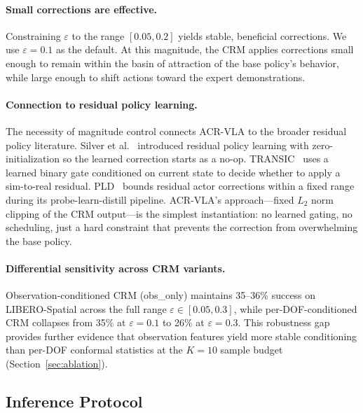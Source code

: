 \paragraph{Small corrections are effective.}
Constraining $\varepsilon$ to the range $[0.05, 0.2]$ yields stable, beneficial corrections. We use $\varepsilon = 0.1$ as the default. At this magnitude, the CRM applies corrections small enough to remain within the basin of attraction of the base policy's behavior, while large enough to shift actions toward the expert demonstrations.

\paragraph{Connection to residual policy learning.}
The necessity of magnitude control connects ACR-VLA to the broader residual policy literature. Silver et al.~\cite{silver2018residual} introduced residual policy learning with zero-initialization so the learned correction starts as a no-op. TRANSIC~\cite{jiang2024transic} uses a learned binary gate conditioned on current state to decide whether to apply a sim-to-real residual. PLD~\cite{xiao2026pld} bounds residual actor corrections within a fixed range during its probe-learn-distill pipeline. ACR-VLA's approach---fixed $L_2$ norm clipping of the CRM output---is the simplest instantiation: no learned gating, no scheduling, just a hard constraint that prevents the correction from overwhelming the base policy.

\paragraph{Differential sensitivity across CRM variants.}
Observation-conditioned CRM (obs\_only) maintains 35--36\% success on LIBERO-Spatial across the full range $\varepsilon \in [0.05, 0.3]$, while per-DOF-conditioned CRM collapses from 35\% at $\varepsilon = 0.1$ to 26\% at $\varepsilon = 0.3$. This robustness gap provides further evidence that observation features yield more stable conditioning than per-DOF conformal statistics at the $K{=}10$ sample budget (Section~\ref{sec:ablation}).

\subsection{Inference Protocol}
\label{sec:inference_protocol}

